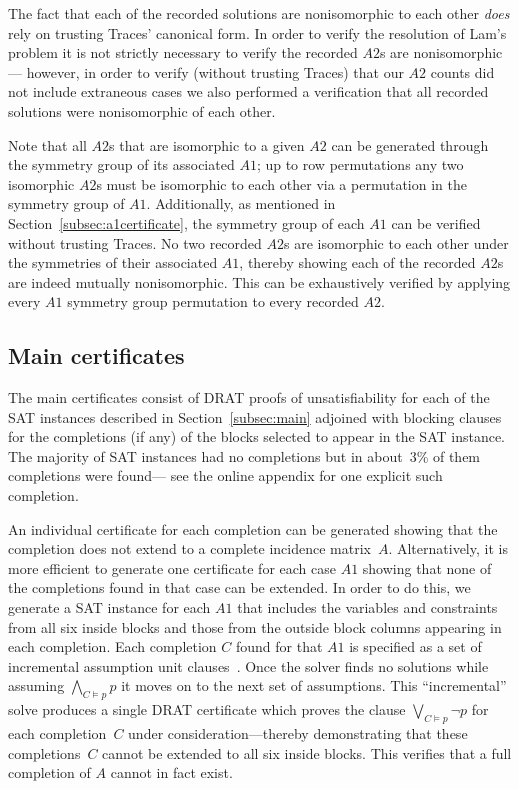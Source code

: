 \documentclass[letterpaper]{article}
\begin{document}
The fact that each of the recorded solutions are nonisomorphic
to each other \emph{does} rely on trusting Traces' canonical form.
In order to verify the resolution
of Lam's problem it is not strictly necessary to verify
the recorded $A2$s are nonisomorphic---%
however, in order to verify (without trusting Traces) that
our $A2$ counts did not include extraneous cases we also performed a verification
that all recorded solutions were nonisomorphic of each other.

Note that all $A2$s that are isomorphic to a given $A2$ can be generated
through the symmetry group of its associated $A1$;
up to row permutations any two isomorphic
$A2$s must be isomorphic to each other via a permutation in the symmetry
group of $A1$.
Additionally, as mentioned in Section~\ref{subsec:a1certificate}, the
symmetry group of each $A1$ can be verified without trusting Traces.
No two recorded $A2$s are isomorphic to each other under
the symmetries of their associated $A1$,
thereby showing each of the recorded $A2$s are indeed mutually nonisomorphic.
This can be exhaustively verified by applying
every $A1$ symmetry group permutation to every recorded $A2$.

\subsection{Main certificates}\label{subsec:maincert}

The main certificates consist of DRAT proofs of unsatisfiability for
each of the SAT instances described in Section~\ref{subsec:main}
adjoined with blocking clauses for the completions (if any)
of the blocks selected to appear in the SAT instance.
The majority of SAT instances had no completions but in about~3\%
of them completions were found---%
see the online appendix for one explicit such completion.

An individual certificate for each completion can be generated
showing that the completion does not extend to a complete incidence
matrix~$A$.  Alternatively, it is more efficient to generate one
certificate for each case $A1$ showing that none of the completions found
in that case can be extended.  In order to do this, we generate
a SAT instance for each $A1$ that includes the variables and constraints from all six inside blocks
and those from the outside block columns appearing in each completion.
Each completion $C$ found for that $A1$
is specified as a set of incremental assumption
unit clauses~\cite{audemard2013improving}.
Once the solver finds no solutions while assuming
$\bigwedge_{C\models p}p$ it moves on to the next set of assumptions.
This ``incremental'' solve produces a single DRAT certificate which
proves the clause $\bigvee_{C\models p}\lnot p$ for each completion~$C$
under consideration---thereby demonstrating that these
completions~$C$ cannot be extended to all six inside blocks.
This verifies that a full completion of $A$ cannot in fact exist.
\end{document}
